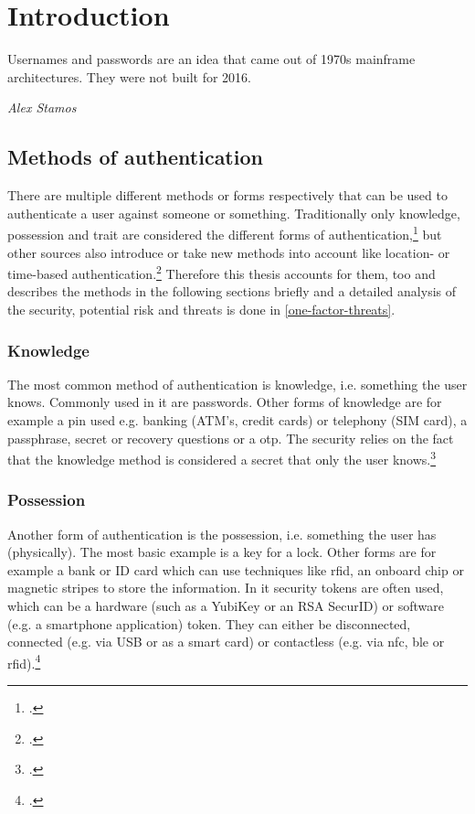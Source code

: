 \chapter{Introduction}

\setlength{}
\epigraph{\frqq Usernames and passwords are an idea that came out of 1970s mainframe architectures. They were not built for 2016.\flqq\footnotemark}{\textit{Alex Stamos}}

\blindtext

\section{Methods of authentication}
There are multiple different methods or forms respectively that can be used to authenticate a user against someone or something. Traditionally only knowledge, possession and trait are considered the different forms of authentication,\footcites[See][299]{10.2307/27845364}[See][140]{brotherston2017defensive}[][47]{anderson2008security} but other sources also introduce or take new methods into account like location- or time-based authentication.\footcites[][]{6296127}[See][191]{dasgupta2017multi} Therefore this thesis accounts for them, too and describes the methods in the following sections briefly and a detailed analysis of the security, potential risk and threats is done in \autoref{one-factor-threats}.

\subsection{Knowledge}

The most common method of authentication is knowledge, i.e. \frqq something the user knows\flqq{}. Commonly used in \gls{it} are passwords. Other forms of knowledge are for example a \gls{pin} used e.g. banking (ATM's, credit cards) or telephony (SIM card), a passphrase, secret or recovery questions or a \gls{otp}. The security relies on the fact that the knowledge method is considered a secret that only the user knows.\footcite[See][467]{eckert-it-sec-9}

\subsection{Possession}

Another form of authentication is the possession, i.e. \frqq something the user has\flqq{} (physically). The most basic example is a key for a lock. Other forms are for example a bank or ID card which can use techniques like \gls{rfid}, an onboard chip or magnetic stripes to store the information. In \gls{it} security tokens are often used, which can be a hardware (such as a YubiKey or an RSA SecurID) or software (e.g. a smartphone application) token. They can either be disconnected, connected (e.g. via USB or as a smart card) or contactless (e.g. via \gls{nfc}, \gls{ble} or \gls{rfid}).\footcites[See][24]{265831}[][]{Dressel:2019:SZT:3319499.3328225}[See][8--11]{1698485}

